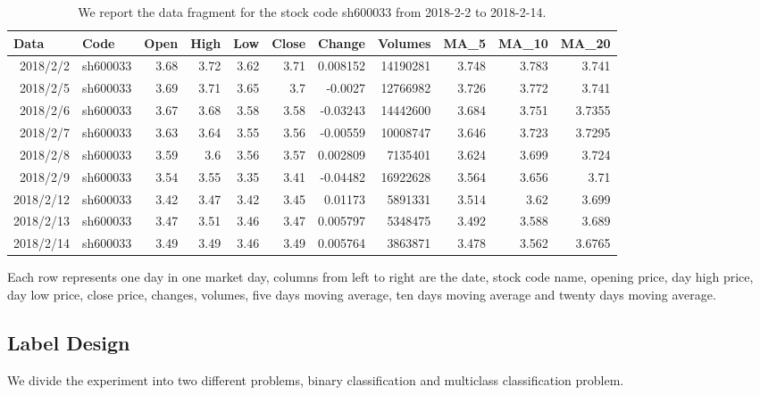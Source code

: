 \documentclass{article}
\begin{document}
\begin{table}[htbp]
	\centering
	\begin{tabular}{rlrrrrrrrrr}
		\toprule
		\multicolumn{1}{l}{\textbf{Data}} & \textbf{Code} & \multicolumn{1}{l}{\textbf{Open}} & \multicolumn{1}{l}{\textbf{High}} & \multicolumn{1}{l}{\textbf{Low}} & \multicolumn{1}{l}{\textbf{Close}} & \multicolumn{1}{l}{\textbf{Change}} & \multicolumn{1}{l}{\textbf{Volumes}} & \multicolumn{1}{l}{\textbf{MA\_5}} & \multicolumn{1}{l}{\textbf{MA\_10}} & \multicolumn{1}{l}{\textbf{MA\_20}} \\
		\midrule
		2018/2/2 & sh600033 & 3.68  & 3.72  & 3.62  & 3.71  & 0.008152 & 14190281 & 3.748 & 3.783 & 3.741 \\
		2018/2/5 & sh600033 & 3.69  & 3.71  & 3.65  & 3.7   & -0.0027 & 12766982 & 3.726 & 3.772 & 3.741 \\
		2018/2/6 & sh600033 & 3.67  & 3.68  & 3.58  & 3.58  & -0.03243 & 14442600 & 3.684 & 3.751 & 3.7355 \\
		2018/2/7 & sh600033 & 3.63  & 3.64  & 3.55  & 3.56  & -0.00559 & 10008747 & 3.646 & 3.723 & 3.7295 \\
		2018/2/8 & sh600033 & 3.59  & 3.6   & 3.56  & 3.57  & 0.002809 & 7135401 & 3.624 & 3.699 & 3.724 \\
		2018/2/9 & sh600033 & 3.54  & 3.55  & 3.35  & 3.41  & -0.04482 & 16922628 & 3.564 & 3.656 & 3.71 \\
		2018/2/12 & sh600033 & 3.42  & 3.47  & 3.42  & 3.45  & 0.01173 & 5891331 & 3.514 & 3.62  & 3.699 \\
		2018/2/13 & sh600033 & 3.47  & 3.51  & 3.46  & 3.47  & 0.005797 & 5348475 & 3.492 & 3.588 & 3.689 \\
		2018/2/14 & sh600033 & 3.49  & 3.49  & 3.46  & 3.49  & 0.005764 & 3863871 & 3.478 & 3.562 & 3.6765 \\
		\bottomrule
	\end{tabular}%
	\vspace{1em}
	\caption{We report the data fragment for the stock code sh600033 from 2018-2-2 to 2018-2-14.}\label{tab:sh600033TradeData} 
\end{table}

Each row represents one day in one market day, columns from left to right are the date, stock code name, opening price, day high price, day low price, close price, changes, volumes, five days moving average, ten days moving average and twenty days moving average.

\subsection{Label Design}
We divide the experiment into two different problems, binary classification and multiclass classification problem.
\end{document}
